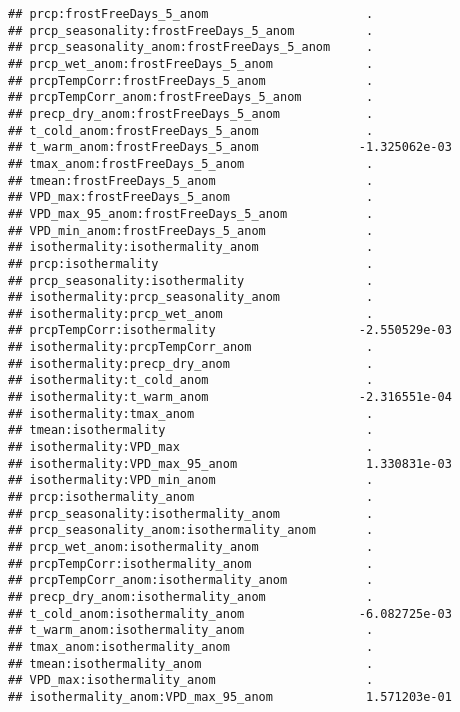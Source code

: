 \documentclass[
]{article}
\begin{document}
\begin{verbatim}
## prcp:frostFreeDays_5_anom                      .           
## prcp_seasonality:frostFreeDays_5_anom          .           
## prcp_seasonality_anom:frostFreeDays_5_anom     .           
## prcp_wet_anom:frostFreeDays_5_anom             .           
## prcpTempCorr:frostFreeDays_5_anom              .           
## prcpTempCorr_anom:frostFreeDays_5_anom         .           
## precp_dry_anom:frostFreeDays_5_anom            .           
## t_cold_anom:frostFreeDays_5_anom               .           
## t_warm_anom:frostFreeDays_5_anom              -1.325062e-03
## tmax_anom:frostFreeDays_5_anom                 .           
## tmean:frostFreeDays_5_anom                     .           
## VPD_max:frostFreeDays_5_anom                   .           
## VPD_max_95_anom:frostFreeDays_5_anom           .           
## VPD_min_anom:frostFreeDays_5_anom              .           
## isothermality:isothermality_anom               .           
## prcp:isothermality                             .           
## prcp_seasonality:isothermality                 .           
## isothermality:prcp_seasonality_anom            .           
## isothermality:prcp_wet_anom                    .           
## prcpTempCorr:isothermality                    -2.550529e-03
## isothermality:prcpTempCorr_anom                .           
## isothermality:precp_dry_anom                   .           
## isothermality:t_cold_anom                      .           
## isothermality:t_warm_anom                     -2.316551e-04
## isothermality:tmax_anom                        .           
## tmean:isothermality                            .           
## isothermality:VPD_max                          .           
## isothermality:VPD_max_95_anom                  1.330831e-03
## isothermality:VPD_min_anom                     .           
## prcp:isothermality_anom                        .           
## prcp_seasonality:isothermality_anom            .           
## prcp_seasonality_anom:isothermality_anom       .           
## prcp_wet_anom:isothermality_anom               .           
## prcpTempCorr:isothermality_anom                .           
## prcpTempCorr_anom:isothermality_anom           .           
## precp_dry_anom:isothermality_anom              .           
## t_cold_anom:isothermality_anom                -6.082725e-03
## t_warm_anom:isothermality_anom                 .           
## tmax_anom:isothermality_anom                   .           
## tmean:isothermality_anom                       .           
## VPD_max:isothermality_anom                     .           
## isothermality_anom:VPD_max_95_anom             1.571203e-01

\end{verbatim}
\end{document}
